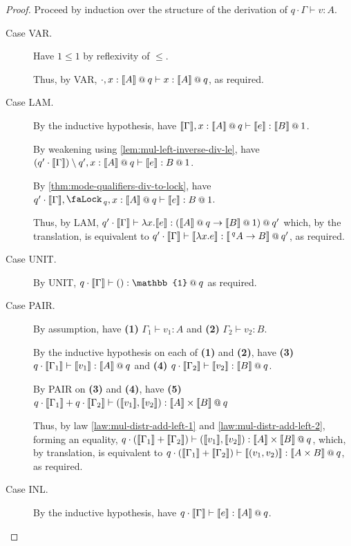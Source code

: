 \documentclass[acmsmall,screen,nonacm]{acmart}
\makeatletter
\newcommand{\at}{\mathbin{\mbox{\small\ensuremath{@}}}}
\newcommand{\unit}{\mathbb{1}}
\newcommand{\tee}{\vdash}
\DeclareMathOperator{\lock}{\tikz{\node[scale=1, line width=0pt, inner sep=0pt] at (0,0) {\faLock\,};}}
\newcommand{\sem}[1]{\llbracket #1 \rrbracket}
\makeatother
\begin{document}
\begin{proof}
  Proceed by induction over the structure of the derivation of $q \cdot \Gamma \tee v : A$.\\
  \begin{description}
    \item[Case VAR.]
    Have $1 \le 1$ by reflexivity of $\le$.
    
    Thus, by VAR, $\cdot, x : \sem{A} \at q \tee x : \sem{A} \at q$, as required.
    \\
    \item[Case LAM.]
    By the inductive hypothesis, have $\sem{\Gamma}, x : \sem{A} \at q \tee \sem{e} : \sem{B} \at 1$. 

    By weakening using \ref{lem:mul-left-inverse-div-le}, have $(q^\prime \cdot \sem{\Gamma}) \setminus q^\prime, x : \sem{A} \at q \tee \sem{e} : B \at 1$. 
    
    By \ref{thm:mode-qualifiers-div-to-lock}, have $q^\prime \cdot \sem{\Gamma}, \lock_q, x : \sem{A} \at q \tee \sem{e} : B \at 1$. 
    
    Thus, by LAM, $q^\prime \cdot \sem{\Gamma} \tee \lambda x.\sem{e} : (\sem{A} \at q \rightarrow \sem{B} \at 1) \at q^\prime$ which, by the translation, is equivalent to $q^\prime \cdot \sem{\Gamma} \tee \sem{\lambda x.e} : \sem{\,^qA \rightarrow B} \at q^\prime$, as required.
    \\
    \item[Case UNIT.]
    By UNIT, $q \cdot \sem{\Gamma} \tee () : \unit \at q$ as required.
    \\ 
    \item[Case PAIR.]
    By assumption, have \textbf{(1)} $\Gamma_1 \tee v_1 : A$ and \textbf{(2)} $\Gamma_2 \tee v_2 : B$.
    
    By the inductive hypothesis on each of \textbf{(1)} and \textbf{(2)}, have \textbf{(3)} $q \cdot \sem{\Gamma_1} \tee \sem{v_1} : \sem{A} \at q$ and \textbf{(4)} $q \cdot \sem{\Gamma_2} \tee \sem{v_2} : \sem{B} \at q$.
    
    By PAIR on \textbf{(3)} and \textbf{(4)}, have \textbf{(5)} $q \cdot \sem{\Gamma_1} + q \cdot \sem{\Gamma_2} \tee (\sem{v_1}, \sem{v_2}) : \sem{A} \times \sem{B} \at q$
    
    Thus, by law \ref{law:mul-distr-add-left-1} and \ref{law:mul-distr-add-left-2}, forming an equality, $q \cdot (\sem{\Gamma_1} + \sem{\Gamma_2}) \tee (\sem{v_1}, \sem{v_2}) : \sem{A} \times \sem{B} \at q$, which, by translation, is equivalent to $q \cdot (\sem{\Gamma_1} + \sem{\Gamma_2}) \tee \sem{(v_1, v_2)} : \sem{A \times B} \at q$, as required.
    \\ 
    \item[Case INL.]
    By the inductive hypothesis, have $q \cdot \sem{\Gamma} \tee \sem{e} : \sem{A} \at q$. 
    

\end{description}
\end{proof}
\end{document}
